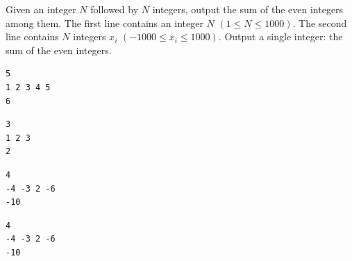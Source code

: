 \Statement
Given an integer $N$ followed by $N$ integers, output the sum of the even integers among them.
\Input
The first line contains an integer $N$ $(1 \leq N \leq 1000)$. The second line contains $N$ integers $x_i$ $(-1000 \leq x_i \leq 1000)$.
\Output
Output a single integer: the sum of the even integers.
\SampleOneCol
\begin{verbatim}
5
1 2 3 4 5
6
\end{verbatim}
\begin{verbatim}
3
1 2 3
2
\end{verbatim}
\begin{verbatim}
4
-4 -3 2 -6
-10
\end{verbatim}
\begin{verbatim}
4
-4 -3 2 -6
-10
\end{verbatim}
